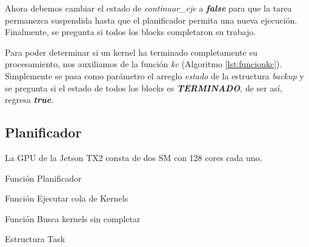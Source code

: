 Ahora debemos cambiar el estado de \textit{continuar\_eje} a \textbf{\textit{false}} para que la tarea permanezca suspendida hasta que el planificador permita una nueva ejecución. Finalmente, se pregunta si todos los blocks completaron su trabajo.



Para poder determinar si un kernel ha terminado completamente su procesamiento, nos auxiliamos de la función \textit{kc} (Algoritmo \ref{lst:funcionkc}). Simplemente se pasa como parámetro el arreglo \textit{estado} de la estructura \textit{backup} y se pregunta si el estado de todos los blocks es \textit{\textbf{TERMINADO}}, de ser así, regresa \textbf{\textit{true}}.




\subsection{Planificador} \label{secc:planificador}

La GPU de la Jetson TX2 consta de dos SM con 128 cores cada uno\cite{SMJetson}.

Función Planificador


  
Función Ejecutar cola de Kernels



Función Busca kernels sin completar



Estructura Task


    	
